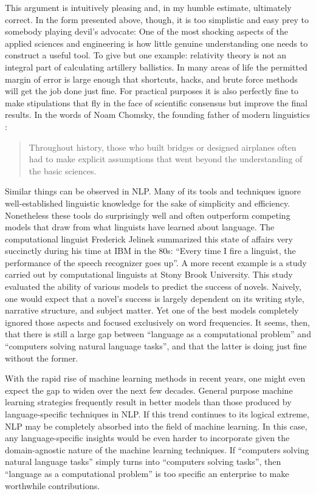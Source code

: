 This argument is intuitively pleasing and, in my humble estimate, ultimately correct.
In the form presented above, though, it is too simplistic and easy prey to somebody playing devil's advocate:
One of the most shocking aspects of the applied sciences and engineering is how little genuine understanding one needs to construct a useful tool.
To give but one example: relativity theory is not an integral part of calculating artillery ballistics.
In many areas of life the permitted margin of error is large enough that shortcuts, hacks, and brute force methods will get the job done just fine.
For practical purposes it is also perfectly fine to make stipulations that fly in the face of scientific consensus but improve the final results.
In the words of Noam Chomsky, the founding father of modern linguistics \citep[147]{Chomsky90}:
%
\begin{quote}
    Throughout history, those who built bridges or designed airplanes often had to make explicit assumptions that went beyond the understanding of the basic sciences.
\end{quote}

Similar things can be observed in NLP\@.
Many of its tools and techniques ignore well-established linguistic knowledge for the sake of simplicity and efficiency.
Nonetheless these tools do surprisingly well and often outperform competing models that draw from what linguists have learned about language.
The computational linguist Frederick Jelinek summarized this state of affairs very succinctly during his time at IBM in the 80s: ``Every time I fire a linguist, the performance of the speech recognizer goes up''.
A more recent example is a study carried out by computational linguists at Stony Brook University.
This study evaluated the ability of various models to predict the success of novels.
Naively, one would expect that a novel's success is largely dependent on its writing style, narrative structure, and subject matter.
Yet one of the best models completely ignored those aspects and focused exclusively on word frequencies.
It seems, then, that there is still a large gap between ``language as a computational problem'' and ``computers solving natural language tasks'', and that the latter is doing just fine without the former.

With the rapid rise of machine learning methods in recent years, one might even expect the gap to widen over the next few decades.
General purpose machine learning strategies frequently result in better models than those produced by language-specific techniques in NLP\@.
If this trend continues to its logical extreme, NLP may be completely absorbed into the field of machine learning.
In this case, any language-specific insights would be even harder to incorporate given the domain-agnostic nature of the machine learning techniques.
If ``computers solving natural language tasks'' simply turns into ``computers solving tasks'', then ``language as a computational problem'' is too specific an enterprise to make worthwhile contributions.

